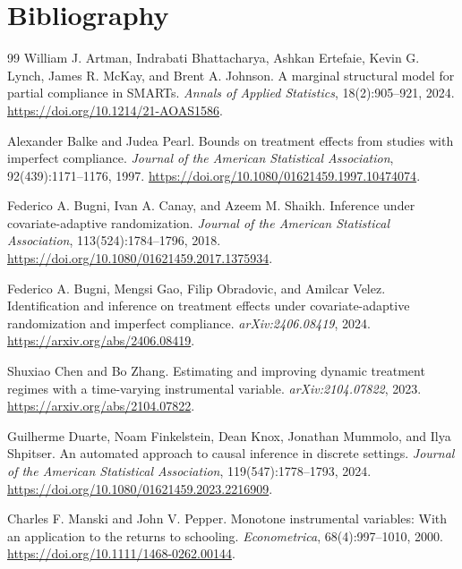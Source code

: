 \documentclass[11pt]{article}
\theoremstyle{definition}
\theoremstyle{plain}
\theoremstyle{remark}
\begin{document}
\section*{Bibliography}
\begin{thebibliography}{99}
William J. Artman, Indrabati Bhattacharya, Ashkan Ertefaie, Kevin G. Lynch, James R. McKay, and Brent A. Johnson.
\newblock A marginal structural model for partial compliance in SMARTs.
\newblock \emph{Annals of Applied Statistics}, 18(2):905--921, 2024.
\newblock \url{https://doi.org/10.1214/21-AOAS1586}.

Alexander Balke and Judea Pearl.
\newblock Bounds on treatment effects from studies with imperfect compliance.
\newblock \emph{Journal of the American Statistical Association}, 92(439):1171--1176, 1997.
\newblock \url{https://doi.org/10.1080/01621459.1997.10474074}.

Federico A. Bugni, Ivan A. Canay, and Azeem M. Shaikh.
\newblock Inference under covariate-adaptive randomization.
\newblock \emph{Journal of the American Statistical Association}, 113(524):1784--1796, 2018.
\newblock \url{https://doi.org/10.1080/01621459.2017.1375934}.

Federico A. Bugni, Mengsi Gao, Filip Obradovic, and Amilcar Velez.
\newblock Identification and inference on treatment effects under covariate-adaptive randomization and imperfect compliance.
\newblock \emph{arXiv:2406.08419}, 2024.
\newblock \url{https://arxiv.org/abs/2406.08419}.

Shuxiao Chen and Bo Zhang.
\newblock Estimating and improving dynamic treatment regimes with a time-varying instrumental variable.
\newblock \emph{arXiv:2104.07822}, 2023.
\newblock \url{https://arxiv.org/abs/2104.07822}.

Guilherme Duarte, Noam Finkelstein, Dean Knox, Jonathan Mummolo, and Ilya Shpitser.
\newblock An automated approach to causal inference in discrete settings.
\newblock \emph{Journal of the American Statistical Association}, 119(547):1778--1793, 2024.
\newblock \url{https://doi.org/10.1080/01621459.2023.2216909}.

Charles F. Manski and John V. Pepper.
\newblock Monotone instrumental variables: With an application to the returns to schooling.
\newblock \emph{Econometrica}, 68(4):997--1010, 2000.
\newblock \url{https://doi.org/10.1111/1468-0262.00144}.


\end{thebibliography}
\end{document}
